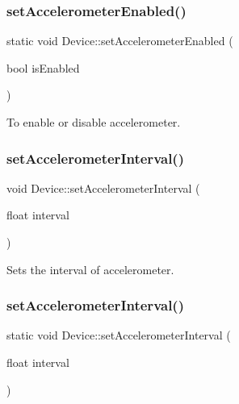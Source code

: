 \subsubsection{\texorpdfstring{set\+Accelerometer\+Enabled()}{setAccelerometerEnabled()}\hspace{0.1cm}{\footnotesize\ttfamily [2/2]}}
{\footnotesize\ttfamily static void Device\+::set\+Accelerometer\+Enabled (\begin{DoxyParamCaption}\item[{bool}]{is\+Enabled }\end{DoxyParamCaption})\hspace{0.3cm}{\ttfamily [static]}}

To enable or disable accelerometer. \mbox{\label{classDevice_a9dfd86f9b58de0b39b4de5bdef7ba0d8}} 
\subsubsection{\texorpdfstring{set\+Accelerometer\+Interval()}{setAccelerometerInterval()}\hspace{0.1cm}{\footnotesize\ttfamily [1/2]}}
{\footnotesize\ttfamily void Device\+::set\+Accelerometer\+Interval (\begin{DoxyParamCaption}\item[{float}]{interval }\end{DoxyParamCaption})\hspace{0.3cm}{\ttfamily [static]}}

Sets the interval of accelerometer. \mbox{\label{classDevice_a787d692ed935080302741b1e85f3bdb5}} 
\subsubsection{\texorpdfstring{set\+Accelerometer\+Interval()}{setAccelerometerInterval()}\hspace{0.1cm}{\footnotesize\ttfamily [2/2]}}
{\footnotesize\ttfamily static void Device\+::set\+Accelerometer\+Interval (\begin{DoxyParamCaption}\item[{float}]{interval }\end{DoxyParamCaption})\hspace{0.3cm}{\ttfamily [static]}}


